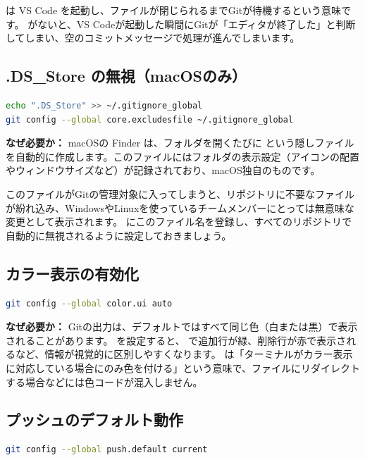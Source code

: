 は VS Code を起動し、ファイルが閉じられるまでGitが待機するという意味です。 がないと、VS Codeが起動した瞬間にGitが「エディタが終了した」と判断してしまい、空のコミットメッセージで処理が進んでしまいます。

\subsection{.DS\_Store の無視（macOSのみ）}

\begin{lstlisting}[language=bash]
echo ".DS_Store" >> ~/.gitignore_global
git config --global core.excludesfile ~/.gitignore_global
\end{lstlisting}

\textbf{なぜ必要か：} macOSの Finder は、フォルダを開くたびに  という隠しファイルを自動的に作成します。このファイルにはフォルダの表示設定（アイコンの配置やウィンドウサイズなど）が記録されており、macOS独自のものです。

このファイルがGitの管理対象に入ってしまうと、リポジトリに不要なファイルが紛れ込み、WindowsやLinuxを使っているチームメンバーにとっては無意味な変更として表示されます。 にこのファイル名を登録し、すべてのリポジトリで自動的に無視されるように設定しておきましょう。

\subsection{カラー表示の有効化}

\begin{lstlisting}[language=bash]
git config --global color.ui auto
\end{lstlisting}

\textbf{なぜ必要か：} Gitの出力は、デフォルトではすべて同じ色（白または黒）で表示されることがあります。 を設定すると、 で追加行が緑、削除行が赤で表示されるなど、情報が視覚的に区別しやすくなります。 は「ターミナルがカラー表示に対応している場合にのみ色を付ける」という意味で、ファイルにリダイレクトする場合などには色コードが混入しません。

\subsection{プッシュのデフォルト動作}

\begin{lstlisting}[language=bash]
git config --global push.default current
\end{lstlisting}

